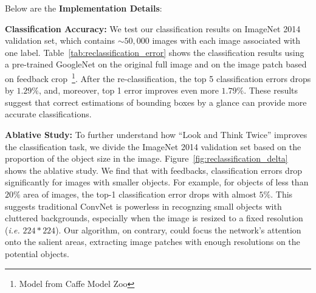 Below are the \textbf{Implementation Details}:
\begin{center}
\end{center}

\textbf{Classification Accuracy:} We test our classification results on ImageNet 2014 validation set, which contains $\sim50,000$ images with each image associated with one label. Table~\ref{tab:reclassification_error} shows the classification results using a pre-trained GoogleNet on the original full image and on the image patch based on feedback crop~\footnote{Model from Caffe Model Zoo}. After the re-classification, the top 5 classification errors drops by $1.29\%$, and, moreover, top 1 error improves even more $1.79\%$. These results suggest that correct estimations of bounding boxes by a glance can provide more accurate classifications.

\textbf{Ablative Study:} To further understand how ``Look and Think Twice'' improves the classification task, we divide the ImageNet 2014 validation set based on the proportion of the object size in the image. Figure~\ref{fig:reclassification_delta} shows the ablative study. We find that with feedbacks, classification errors drop significantly for images with smaller objects. For example, for objects of less than $20\%$ area of images, the top-1 classification error drops with almost
$5\%$. This suggests traditional ConvNet is powerless in recognzing small objects with cluttered backgrounds, especially when the image is resized to a fixed resolution ({\em i.e.} $224*224$). Our algorithm, on contrary, could focus the network's attention onto the salient areas, extracting image patches with enough resolutions on the potential objects.

